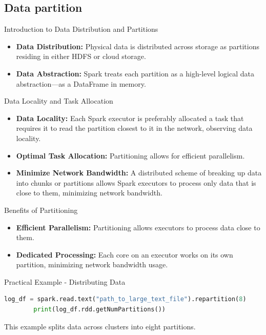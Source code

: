 \subsection{Data partition}\label{subsec:data-partition}


\begin{frame}{Introduction to Data Distribution and Partitions}
    \begin{itemize}
        \item \textbf{Data Distribution:} Physical data is distributed across storage as partitions residing in either HDFS  or cloud storage.
        \item \textbf{Data Abstraction:} Spark treats each partition as a high-level logical data abstraction—as  a DataFrame in memory.
    \end{itemize}
\end{frame}

\begin{frame}{Data Locality and Task Allocation}
    \begin{itemize}
        \item \textbf{Data Locality:} Each Spark executor is  preferably allocated a task that requires it to read the partition closest to it in the network, observing data locality.
        \item \textbf{Optimal Task Allocation:} Partitioning allows for efficient parallelism.
        \item \textbf{Minimize Network Bandwidth:} A distributed scheme of breaking up data into chunks or partitions allows Spark executors to process only data that is close to  them, minimizing network bandwidth.
    \end{itemize}
\end{frame}

\begin{frame}{Benefits of Partitioning}
    \begin{itemize}
        \item \textbf{Efficient Parallelism:} Partitioning allows executors to process data close to them.
        \item \textbf{Dedicated Processing:} Each core on an executor works on its own partition, minimizing network bandwidth usage.
    \end{itemize}
\end{frame}

\begin{frame}[fragile]{Practical Example - Distributing Data}
    \begin{lstlisting}[language=Python,label={lst:pyspark-data-partitioning}]
        log_df = spark.read.text("path_to_large_text_file").repartition(8)
        print(log_df.rdd.getNumPartitions())
    \end{lstlisting}
    This example splits data across clusters into eight partitions.
\end{frame}

